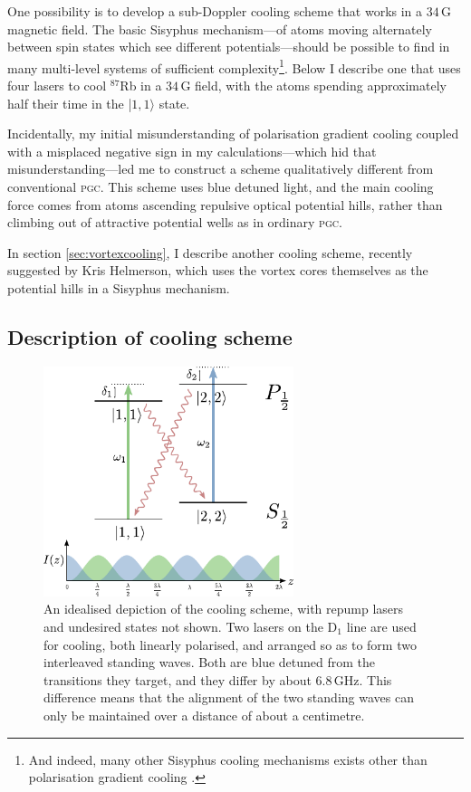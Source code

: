 One possibility is to develop a sub-Doppler cooling scheme that works in a $34\,$G magnetic field. The basic Sisyphus mechanism---of atoms moving alternately between spin states which see different potentials---should be possible to find in many multi-level systems of sufficient complexity\footnote{And indeed, many other Sisyphus cooling mechanisms exists other than polarisation gradient cooling \cite[p 116]{metcalf_laser_1999}.}. Below I describe one that uses four lasers to cool $^{87}$Rb in a $34\,$G field, with the atoms spending approximately half their time in the \mbox{|$1,1\rangle$} state.

Incidentally, my initial misunderstanding of polarisation gradient cooling coupled with a misplaced negative sign in my calculations---which hid that misunderstanding---led me to construct a scheme qualitatively different from conventional \textsc{pgc}. This scheme uses blue detuned light, and the main cooling force comes from atoms ascending repulsive optical potential hills, rather than climbing out of attractive potential wells as in ordinary \textsc{pgc}.

In section \ref{sec:vortexcooling}, I describe another cooling scheme, recently suggested by Kris Helmerson, which uses the vortex cores themselves as the potential hills in a Sisyphus mechanism.

\subsection{Description of cooling scheme}

\begin{figure}
\begin{center}
\includegraphics[width=0.65\textwidth]{figures/unsorted/cooling_simplified.pdf}
\caption{\label{fig:cooling_simplified}An idealised depiction of the cooling scheme, with repump lasers and undesired states not shown. Two lasers on the D$_1$ line are used for cooling, both linearly polarised, and arranged so as to form two interleaved standing waves. Both are blue detuned from the transitions they target, and they differ by about $6.8\,$GHz. This difference means that the alignment of the two standing waves can only be maintained over a distance of about a centimetre.}
\end{center}
\end{figure}

